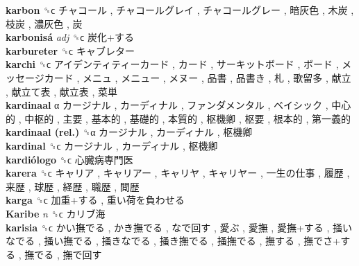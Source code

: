 \textbf{karbon} ␝ϲ   チャコール ,  チャコールグレイ ,  チャコールグレー ,  暗灰色 ,  木炭 ,  枝炭 ,  濃灰色 ,  炭   \\
\textbf{karbonisá} \emph{adj}  ␝ϲ   炭化+する   \\
\textbf{karbureter} ␝ϲ   キャブレター   \\
\textbf{karchi} ␝ϲ   アイデンティティーカード ,  カード ,  サーキットボード ,  ボード ,  メッセージカード ,  メニュ ,  メニュー ,  メヌー ,  品書 ,  品書き ,  札 ,  歌留多 ,  献立 ,  献立て表 ,  献立表 ,  菜単   \\
\textbf{kardinaal} α   カージナル ,  カーディナル ,  ファンダメンタル ,  ベイシック ,  中心的 ,  中枢的 ,  主要 ,  基本的 ,  基礎的 ,  本質的 ,  枢機卿 ,  枢要 ,  根本的 ,  第一義的   \\
\textbf{kardinaal (rel.)} ␝α   カージナル ,  カーディナル ,  枢機卿   \\
\textbf{kardinal} ␝ϲ   カージナル ,  カーディナル ,  枢機卿   \\
\textbf{kardiólogo} ␝ϲ   心臓病専門医   \\
\textbf{karera} ␝ϲ   キャリア ,  キャリアー ,  キャリヤ ,  キャリヤー ,  一生の仕事 ,  履歴 ,  来歴 ,  球歴 ,  経歴 ,  職歴 ,  閲歴   \\
\textbf{karga} ␝ϲ   加重+する ,  重い荷を負わせる   \\
\textbf{Karibe} \emph{n}  ␝ϲ   カリブ海   \\
\textbf{karisia} ␝ϲ   かい撫でる ,  かき撫でる ,  なで回す ,  愛ぶ ,  愛撫 ,  愛撫+する ,  掻いなでる ,  掻い撫でる ,  掻きなでる ,  掻き撫でる ,  掻撫でる ,  撫する ,  撫でさ+する ,  撫でる ,  撫で回す   \\
